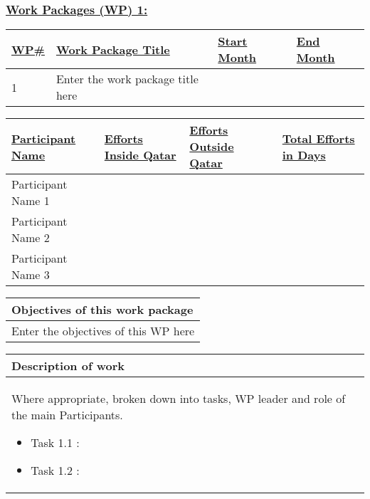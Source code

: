 \documentclass[a4paper,11pt]{nprp}
\begin{document}
\subsubsection{\underline{Work Packages (WP) 1:}}

\begin{center}

\setlength{\realwidth}{\dimexpr \textwidth - 8\tabcolsep - 5\arrayrulewidth}
\begin{tabular}{|p{0.1\realwidth}|p{0.6\realwidth}|p{0.15\realwidth}|p{0.15\realwidth}|}
\hline
  \textbf{\ul{WP\#}} & 
  \textbf{\ul{Work Package Title}} & 
  \textbf{\ul{Start Month}} &
  \textbf{\ul{End Month}} \\
\hline
1 & Enter the work package title here &  &  \\
\hline
\end{tabular}

\vspace{1em}

\setlength{\realwidth}{\dimexpr \textwidth - 8\tabcolsep - 5\arrayrulewidth}
\begin{tabular}{|p{0.4\realwidth}|p{0.22\realwidth}|p{0.2\realwidth}|C{0.18\realwidth}|}
\hline
  \textbf{\ul{Participant Name}} & 
  \textbf{\ul{Efforts Inside Qatar}} & 
  \textbf{\ul{Efforts Outside Qatar}} &
  \textbf{\ul{Total Efforts in Days}} \\
\hline
Participant Name 1 &  &  &  \\
\hline
Participant Name 2 &  &  &  \\
\hline
Participant Name 3 &  &  &  \\
\hline
\end{tabular}

\vspace{1em}

\setlength{\realwidth}{\dimexpr \textwidth - 2\tabcolsep - 2\arrayrulewidth}
\begin{tabular}{|p{1\realwidth}|}
\hline
\textbf{Objectives of this work package} \\
\hline
Enter the objectives of this WP here \\
\hline
\end{tabular}

\vspace{1em}

\begin{tabular}{|p{1\realwidth}|}
\hline
\textbf{Description of work} \\
\hline
Where appropriate, broken down into tasks, WP leader and role of the main Participants.
\begin{itemize}
  \item Task 1.1 :
  \item Task 1.2 :
\end{itemize}
 \\
\hline
\end{tabular}


\end{center}
\end{document}
